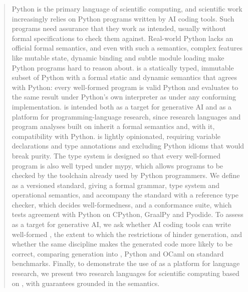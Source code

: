 \documentclass[acmsmall,anonymous,review]{acmart}
\begin{document}
\begin{abstract}
Python is the primary language of scientific computing, and scientific work increasingly relies on Python
programs written by AI coding tools. Such programs need assurance that they work as intended, usually without
formal specifications to check them against. Real-world Python lacks an official formal semantics, and even with such a semantics, complex features like
mutable state, dynamic binding and subtle module loading make Python programs hard to reason about. \PurePy is a statically typed, immutable subset of Python with a formal static and dynamic
semantics that agrees with Python: every well-formed \PurePy program is valid Python and evaluates to the same result
under Python's own interpreter as under any conforming \PurePy implementation. \PurePy is intended both as a target for
generative AI and as a platform for programming-language research, since research languages and program
analyses built on \PurePy inherit a formal semantics and, with it, compatibility with Python. \PurePy is lightly opinionated, requiring
variable declarations and type annotations and excluding Python idioms that would break purity. The type system
is designed so that every well-formed program is also well typed under mypy, which allows \PurePy programs to be
checked by the toolchain already used by Python programmers. We define \PurePy as a versioned standard, giving
a formal grammar, type system and operational semantics, and accompany the standard with a reference type checker, which
decides well-formedness, and a conformance suite, which tests agreement with Python on CPython, GraalPy and
Pyodide. To assess \PurePy as a target for generative AI, we ask whether AI coding tools can write
well-formed \PurePy, the extent to which the restrictions of \PurePy hinder generation, and whether the same
discipline makes the generated code more likely to be correct, comparing generation into \PurePy, Python and OCaml on standard benchmarks. Finally, to demonstrate the use of \PurePy as a platform for
language research, we present two research languages for scientific computing based on \PurePy, with guarantees
grounded in the \PurePy semantics.
\end{abstract}

\maketitle












\label{references}


\end{document}
